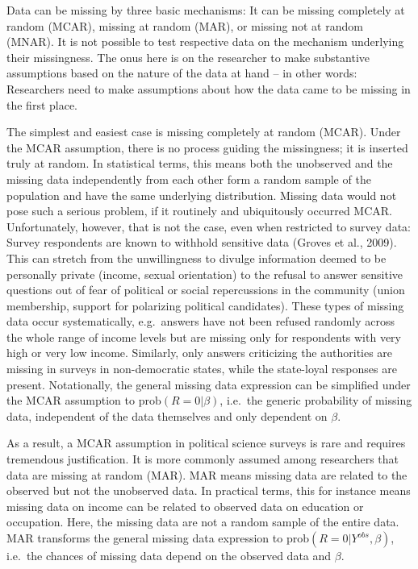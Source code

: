\documentclass[12pt,econ]{sources/authesis}
\begin{document}
Data can be missing by three basic mechanisms: It can be missing completely at random (MCAR), missing at random (MAR), or missing not at random (MNAR). It is not possible to test respective data on the mechanism underlying their missingness. The onus here is on the researcher to make substantive assumptions based on the nature of the data at hand -- in other words: Researchers need to make assumptions about how the data came to be missing in the first place.

The simplest and easiest case is missing completely at random (MCAR). Under the MCAR assumption, there is no process guiding the missingness; it is inserted truly at random. In statistical terms, this means both the unobserved and the missing data independently from each other form a random sample of the population and have the same underlying distribution. Missing data would not pose such a serious problem, if it routinely and ubiquitously occurred MCAR. Unfortunately, however, that is not the case, even when restricted to survey data: Survey respondents are known to withhold sensitive data (Groves et al., 2009). This can stretch from the unwillingness to divulge information deemed to be personally private (income, sexual orientation) to the refusal to answer sensitive questions out of fear of political or social repercussions in the community (union membership, support for polarizing political candidates). These types of missing data occur systematically, e.g.~answers have not been refused randomly across the whole range of income levels but are missing only for respondents with very high or very low income. Similarly, only answers criticizing the authorities are missing in surveys in non-democratic states, while the state-loyal responses are present. Notationally, the general missing data expression can be simplified under the MCAR assumption to \(\text{prob}(R = 0 | \beta)\), i.e.~the generic probability of missing data, independent of the data themselves and only dependent on \(\beta\).

As a result, a MCAR assumption in political science surveys is rare and requires tremendous justification. It is more commonly assumed among researchers that data are missing at random (MAR). MAR means missing data are related to the observed but not the unobserved data. In practical terms, this for instance means missing data on income can be related to observed data on education or occupation. Here, the missing data are not a random sample of the entire data. MAR transforms the general missing data expression to \(\text{prob}(R = 0 | Y^{obs}, \beta)\), i.e.~the chances of missing data depend on the observed data and \(\beta\).
\end{document}

